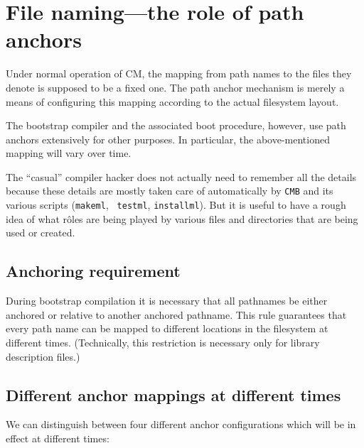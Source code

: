 %

\section{File naming---the role of path anchors}

Under normal operation of CM, the mapping from path names to the files
they denote is supposed to be a fixed one.  The path anchor mechanism
is merely a means of configuring this mapping according to the
actual filesystem layout.

The bootstrap compiler and the associated boot procedure, however, use
path anchors extensively for other purposes.  In particular, the
above-mentioned mapping will vary over time.

The ``casual'' compiler hacker does not actually need to remember all
the details because these details are mostly taken care of
automatically by {\tt CMB} and its various scripts ({\tt makeml}, {\tt
testml}, {\tt installml}).  But it is useful to have a rough idea of
what r\^{o}les are being played by various files and directories that
are being used or created.

\subsection{Anchoring requirement}

During bootstrap compilation it is necessary that all pathnames be
either anchored or relative to another anchored pathname.  This rule
guarantees that every path name can be mapped to different locations
in the filesystem at different times.  (Technically, this restriction
is necessary only for library description files.)

\subsection{Different anchor mappings at different times}

We can distinguish between four different anchor configurations which
will be in effect at different times:


